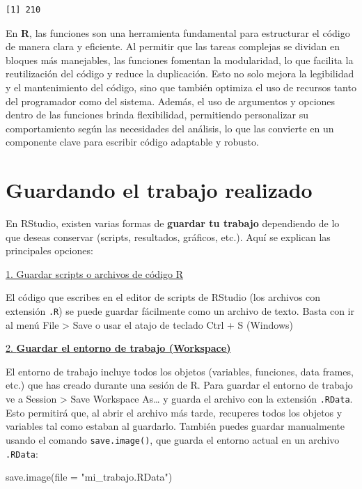 \documentclass[
  letterpaper,
]{scrbook}
\newenvironment{Shaded}{\begin{snugshade}}{\end{snugshade}}
\newcommand{\AttributeTok}[1]{\textcolor[rgb]{0.40,0.45,0.13}{#1}}
\newcommand{\FunctionTok}[1]{\textcolor[rgb]{0.28,0.35,0.67}{#1}}
\newcommand{\NormalTok}[1]{\textcolor[rgb]{0.00,0.23,0.31}{#1}}
\newcommand{\StringTok}[1]{\textcolor[rgb]{0.13,0.47,0.30}{#1}}
\begin{document}
\begin{verbatim}
[1] 210
\end{verbatim}

En \textbf{R}, las funciones son una herramienta fundamental para
estructurar el código de manera clara y eficiente. Al permitir que las
tareas complejas se dividan en bloques más manejables, las funciones
fomentan la modularidad, lo que facilita la reutilización del código y
reduce la duplicación. Esto no solo mejora la legibilidad y el
mantenimiento del código, sino que también optimiza el uso de recursos
tanto del programador como del sistema. Además, el uso de argumentos y
opciones dentro de las funciones brinda flexibilidad, permitiendo
personalizar su comportamiento según las necesidades del análisis, lo
que las convierte en un componente clave para escribir código adaptable
y robusto.

\hypertarget{guardando-el-trabajo-realizado}{%
\section{Guardando el trabajo
realizado}\label{guardando-el-trabajo-realizado}}

En RStudio, existen varias formas de \textbf{guardar tu trabajo}
dependiendo de lo que deseas conservar (scripts, resultados, gráficos,
etc.). Aquí se explican las principales opciones:

\uline{1. Guardar scripts o archivos de código R}

El código que escribes en el editor de scripts de RStudio (los archivos
con extensión \texttt{.R}) se puede guardar fácilmente como un archivo
de texto. Basta con ir al menú File \textgreater{} Save o usar el atajo
de teclado Ctrl + S (Windows)

\uline{2. \textbf{Guardar el entorno de trabajo (Workspace)}}

El entorno de trabajo incluye todos los objetos (variables, funciones,
data frames, etc.) que has creado durante una sesión de R. Para guardar
el entorno de trabajo ve a Session \textgreater{} Save Workspace
As\ldots{} y guarda el archivo con la extensión \texttt{.RData}. Esto
permitirá que, al abrir el archivo más tarde, recuperes todos los
objetos y variables tal como estaban al guardarlo. También puedes
guardar manualmente usando el comando \texttt{save.image()}, que guarda
el entorno actual en un archivo \texttt{.RData}:

\begin{Shaded}
\begin{Highlighting}[]
\FunctionTok{save.image}\NormalTok{(}\AttributeTok{file =} \StringTok{"mi\_trabajo.RData"}\NormalTok{) }
\end{Highlighting}
\end{Shaded}
\end{document}
